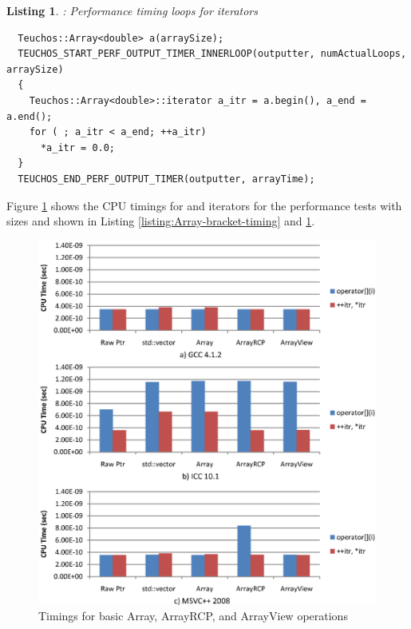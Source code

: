 \documentclass[pdf,ps2pdf,11pt]{SANDreport}
\newtheorem{listing}{Listing}
\begin{document}
\begin{listing}: Performance timing loops for {} iterators \\
\label{listing:Array-iterator-timing}
{\small\begin{verbatim}
  Teuchos::Array<double> a(arraySize); 
  TEUCHOS_START_PERF_OUTPUT_TIMER_INNERLOOP(outputter, numActualLoops, arraySize) 
  { 
    Teuchos::Array<double>::iterator a_itr = a.begin(), a_end = a.end(); 
    for ( ; a_itr < a_end; ++a_itr) 
      *a_itr = 0.0; 
  }
  TEUCHOS_END_PERF_OUTPUT_TIMER(outputter, arrayTime); 
\end{verbatim}}
\end{listing}


Figure {}\ref{fig:ArrayTimings} shows the CPU timings for
{} and iterators for the performance
tests with sizes {} and
{} shown in Listing
{}\ref{listing:Array-bracket-timing} and
{}\ref{listing:Array-iterator-timing}.


{\bsinglespace
\begin{figure}
\begin{center}
\includegraphics*[angle=0,scale=1.00]{ArrayTimings}
\end{center}
\caption{
\label{fig:ArrayTimings}
Timings for basic Array, ArrayRCP, and ArrayView operations}
\end{figure}
\esinglespace}
\end{document}
